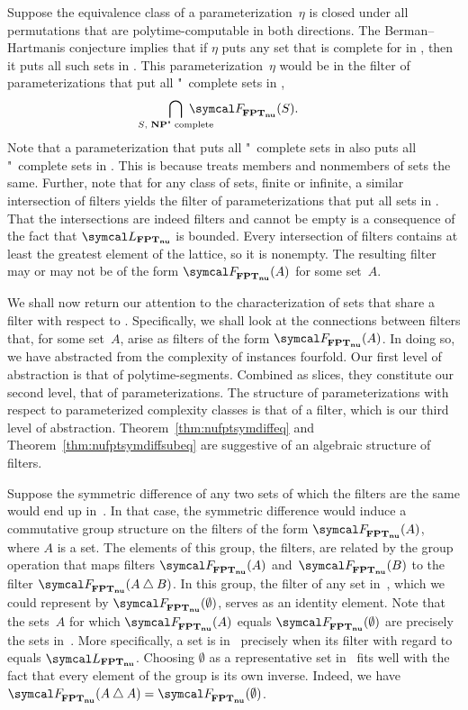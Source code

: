 Suppose the equivalence class of a parameterization~$\eta$ is closed under all permutations that are polytime-computable in both directions.
The Berman--Hartmanis conjecture implies that if $\eta$ puts any set that is complete for  in , then it puts all such sets in .
This parameterization~$\eta$ would be in the filter of parameterizations that put all "~complete sets in ,
\begin{equation*}
  \bigcap_{\mathclap{S\text{, \cl{NP}"~complete}}}\ \calF_\clnu{FPT}(S).
\end{equation*}
Note that a parameterization that puts all "~complete sets in  also puts all "~complete sets in .
This is because  treats members and nonmembers of sets the same.
Further, note that for any class of sets, finite or infinite, a similar intersection of filters yields the filter of parameterizations that put all sets in .
That the intersections are indeed filters and cannot be empty is a consequence of the fact that $\calL_\clnu{FPT}$ is bounded.
Every intersection of filters contains at least the greatest element of the lattice, so it is nonempty.
The resulting filter may or may not be of the form $\calF_\clnu{FPT}(A)$ for some set~$A$.

\medbreak
We shall now return our attention to the characterization of sets that share a filter with respect to .
Specifically, we shall look at the connections between filters that, for some set~$A$, arise as filters of the form $\calF_\clnu{FPT}(A)$.
In doing so, we have abstracted from the complexity of instances fourfold.
Our first level of abstraction is that of polytime-segments.
Combined as slices, they constitute our second level, that of parameterizations.
The structure of parameterizations with respect to parameterized complexity classes is that of a filter, which is our third level of abstraction.
Theorem~\ref{thm:nufptsymdiffeq} and Theorem~\ref{thm:nufptsymdiffsubeq} are suggestive of an algebraic structure of filters.

Suppose the symmetric difference of any two sets of which the filters are the same would end up in~.
In that case, the symmetric difference would induce a commutative group structure on the filters of the form $\calF_\clnu{FPT}(A)$, where $A$ is a set.
The elements of this group, the filters, are related by the group operation that maps filters $\calF_\clnu{FPT}(A)$ and~$\calF_\clnu{FPT}(B)$ to the filter $\calF_\clnu{FPT}(A \symdiff B)$.
In this group, the filter of any set in~, which we could represent by $\calF_\clnu{FPT}(\emptyset)$, serves as an identity element.
Note that the sets~$A$ for which $\calF_\clnu{FPT}(A)$ equals $\calF_\clnu{FPT}(\emptyset)$ are precisely the sets in~.
More specifically, a set is in~ precisely when its filter with regard to  equals $\calL_\clnu{FPT}$.
Choosing $\emptyset$ as a representative set in~ fits well with the fact that every element of the group is its own inverse.
Indeed, we have $\calF_\clnu{FPT}(A \symdiff A) = \calF_\clnu{FPT}(\emptyset)$.

